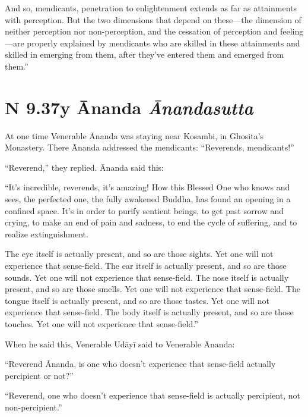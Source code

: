 \documentclass[12pt,openany]{book}%
\newcommand*{\suttatitleacronym}[1]{\smaller[2]{#1}\vspace*{.3em}}
\newcommand*{\suttatitletranslation}[1]{\linebreak{#1}}
\newcommand*{\suttatitleroot}[1]{\linebreak\smaller[2]\itshape{#1}}
\newcommand*{\tocacronym}[1]{\hspace*{-3.3em}{#1}\quad}
\newcommand*{\toctranslation}[1]{#1}
\newcommand*{\tocroot}[1]{(\textit{#1})}
\begin{document}
And so, mendicants, penetration to enlightenment extends as far as attainments with perception. But the two dimensions that depend on these—the dimension of neither perception nor non-perception, and the cessation of perception and feeling—are properly explained by mendicants who are skilled in these attainments and skilled in emerging from them, after they’ve entered them and emerged from them.” 

%
\section*{{\suttatitleacronym AN 9.37}{\suttatitletranslation By Ānanda }{\suttatitleroot Ānandasutta}}
\addcontentsline{toc}{section}{\tocacronym{AN 9.37} \toctranslation{By Ānanda } \tocroot{Ānandasutta}}

At one time Venerable Ānanda was staying near Kosambi, in Ghosita’s Monastery. There Ānanda addressed the mendicants: “Reverends, mendicants!” 

“Reverend,” they replied. Ānanda said this: 

“It’s incredible, reverends, it’s amazing! How this Blessed One who knows and sees, the perfected one, the fully awakened Buddha, has found an opening in a confined space. It’s in order to purify sentient beings, to get past sorrow and crying, to make an end of pain and sadness, to end the cycle of suffering, and to realize extinguishment. 

The eye itself is actually present, and so are those sights. Yet one will not experience that sense-field. The ear itself is actually present, and so are those sounds. Yet one will not experience that sense-field. The nose itself is actually present, and so are those smells. Yet one will not experience that sense-field. The tongue itself is actually present, and so are those tastes. Yet one will not experience that sense-field. The body itself is actually present, and so are those touches. Yet one will not experience that sense-field.” 

When he said this, Venerable \textsanskrit{Udāyī} said to Venerable Ānanda: 

“Reverend Ānanda, is one who doesn’t experience that sense-field actually percipient or not?” 

“Reverend, one who doesn’t experience that sense-field is actually percipient, not non-percipient.” 
\end{document}
